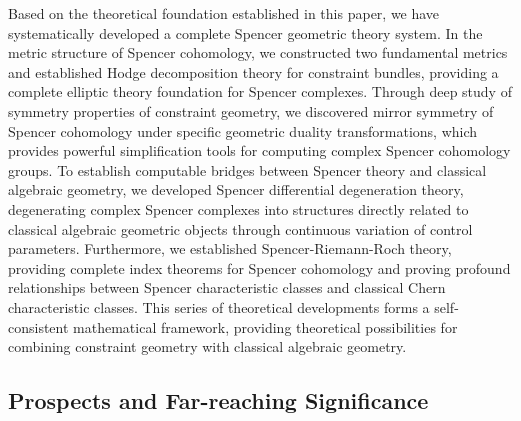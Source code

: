 \documentclass[a4paper,12pt]{extarticle}
\theoremstyle{definition}
\begin{document}
Based on the theoretical foundation established in this paper, we have systematically developed a complete Spencer geometric theory system. In the metric structure of Spencer cohomology, we constructed two fundamental metrics and established Hodge decomposition theory for constraint bundles\cite{zheng2025constructing}, providing a complete elliptic theory foundation for Spencer complexes. Through deep study of symmetry properties of constraint geometry, we discovered mirror symmetry of Spencer cohomology under specific geometric duality transformations\cite{zheng2025mirror,zheng2025geometric}, which provides powerful simplification tools for computing complex Spencer cohomology groups. To establish computable bridges between Spencer theory and classical algebraic geometry, we developed Spencer differential degeneration theory\cite{zheng2025spencerdifferentialdegenerationtheory}, degenerating complex Spencer complexes into structures directly related to classical algebraic geometric objects through continuous variation of control parameters. Furthermore, we established Spencer-Riemann-Roch theory\cite{zheng2025spencer-riemann-roch,zheng2025analytic}, providing complete index theorems for Spencer cohomology and proving profound relationships between Spencer characteristic classes and classical Chern characteristic classes. This series of theoretical developments forms a self-consistent mathematical framework, providing theoretical possibilities for combining constraint geometry with classical algebraic geometry.

\subsection{Prospects and Far-reaching Significance}
\end{document}
